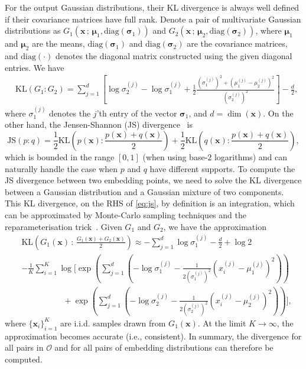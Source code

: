 \documentclass{article}
\newcommand{\kl}{\mathrm{KL}}
\newcommand{\js}{\mathrm{JS}}
\begin{document}
For the output Gaussian distributions, their KL divergence is always well defined
if their covariance matrices have full rank.
Denote a pair of multivariate Gaussian distributions as
$G_1(\bm{x}\,;\,\bm\mu_1,\mathrm{diag}(\bm\sigma_1))$ and
$G_2(\bm{x}\,;\,\bm\mu_2,\mathrm{diag}(\bm\sigma_2))$,
where $\bm\mu_1$ and $\bm\mu_2$ are the means,
$\mathrm{diag}(\bm\sigma_1)$ and
$\mathrm{diag}(\bm\sigma_2)$ are the covariance matrices,
and
$\mathrm{diag}(\cdot)$ denotes the diagonal matrix
constructed using the given diagonal entries. We have
\begin{align}
&\kl(G_1:G_2) =
\sum_{j=1}^d \left[\log\sigma_2^{(j)}-\log\sigma_1^{(j)}
+ \frac{1}{2} \frac{(\sigma_1^{(j)})^2 + (\mu_1^{(j)}-\mu_2^{(j)})^2}{(\sigma_2^{(j)})^2}\right]
-\frac{d}{2},
\end{align}
where $\sigma_1^{(j)}$ denotes the $j$'th entry of the vector $\bm\sigma_1$,
and $d=\dim(\bm{x})$.
%
On the other hand, the Jensen-Shannon (JS) divergence~\cite{JS-2019} is
\begin{equation}\label{eq:js}
\js(p : q) =
\frac{1}{2}\kl\left( p(\bm{x}) : \frac{p(\bm{x})+q(\bm{x})}{2} \right)
+ \frac{1}{2}\kl\left( q(\bm{x}) : \frac{p(\bm{x})+q(\bm{x})}{2} \right),
\end{equation}
which is bounded in the range $[0,1]$ (when using base-$2$ logarithms) and can naturally handle the case when $p$
and $q$ have different supports.
To compute the JS divergence between two embedding points, we need to solve the
KL divergence between a Gaussian distribution and a Gaussian mixture of two
components. This KL divergence, on the RHS of \cref{eq:js}, by definition is an integration,
which can be approximated by Monte-Carlo sampling techniques and the reparameterisation
trick~\cite{vae}. Given $G_1$ and $G_2$, we have the approximation
\begin{align}
&\kl\left(G_1(\bm{x})\,:\,\frac{G_1(\bm{x})+G_2(\bm{x})}{2}\right)
\approx
-\sum_{j=1}^d \log\sigma_1^{(j)} -\frac{d}{2} + \log{2}\nonumber\\
&
-\frac{1}{K}\sum_{i=1}^K
\log\Bigg[
\exp\left(\sum_{j=1}^d\left( -\log\sigma_1^{(j)} -\frac{1}{2(\sigma_1^{(j)})^2}(x_i^{(j)}-\mu_1^{(j)})^2\right)\right)
\nonumber\\
&\hspace{5em}
+\exp\left(\sum_{j=1}^d\left( -\log\sigma_2^{(j)} -\frac{1}{2(\sigma_2^{(j)})^2}(x_i^{(j)}-\mu_2^{(j)})^2\right)\right)
\Bigg],
\end{align}
where $\{\bm{x}_i\}_{i=1}^K$ are i.i.d. samples drawn from $G_1(\bm{x})$.
At the limit $K\to\infty$, the approximation becomes accurate (i.e., consistent).
In summary, the divergence for all pairs in $\mathcal{O}$ and for all pairs
of embedding distributions can therefore be computed.
\end{document}
